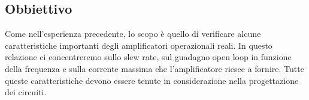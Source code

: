 \subsection{Obbiettivo}

Come nell'esperienza precedente, lo scopo è quello di verificare alcune
caratteristiche importanti degli amplificatori operazionali reali. In
questo relazione ci concentreremo sullo slew rate, sul guadagno open loop
in funzione della frequenza e sulla corrente massima che l'amplificatore
riesce a fornire. Tutte queste caratteristiche devono essere tenute in
considerazione nella progettazione dei circuiti.
